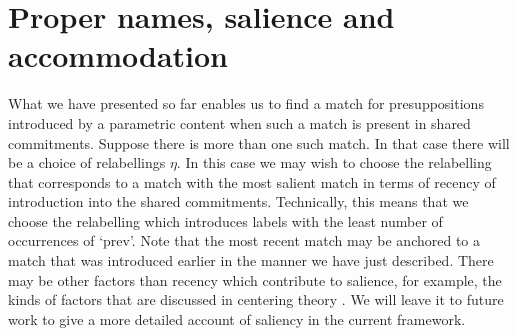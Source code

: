   


\section{Proper names, salience and accommodation}
\label{sec:accommodation}

What we have presented so far enables us to find a match for
presuppositions introduced by a parametric content when such a match
is present in shared commitments.  Suppose there is more than one such
match.  In that case there will be a choice of relabellings $\eta$.
In this case we may wish to choose the relabelling that corresponds to
a match with the most salient match in terms of recency of
introduction into the shared commitments.  Technically, this means
that we choose the relabelling which introduces labels with the least
number of occurrences of `prev'.  Note that the most recent match may
be anchored to a match that was introduced earlier in the manner we
have just described.  There may be other factors than recency which
contribute to salience, for example, the kinds of factors that are
discussed in centering theory \citep{JoshiWeinstein1981,GroszJoshiWeinstein1983,GroszJoshiWeinstein1995,WalkerJoshiPrince1998,PoesioStevensonEugenioHitzeman2004}.  We will leave it to future work to give a
more detailed account of saliency in the current framework.

